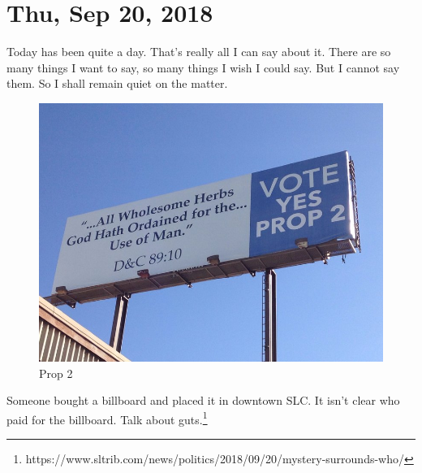 \section{Thu, Sep 20, 2018}

Today has been quite a day. That's really all I can say about it. There are so many
things I want to say, so many things I wish I could say. But I cannot say them. So I
shall remain quiet on the matter.

\begin{figure}[h!]
  \centering
  \includegraphics[width=1\linewidth]{2018/images/prop2.jpg}
  \caption{Prop 2}
  \label{fig:prop2}
\end{figure}

Someone bought a billboard and placed it in downtown SLC. It isn't clear who paid for
the billboard. Talk about guts.\footnote{
https://www.sltrib.com/news/politics/2018/09/20/mystery-surrounds-who/}